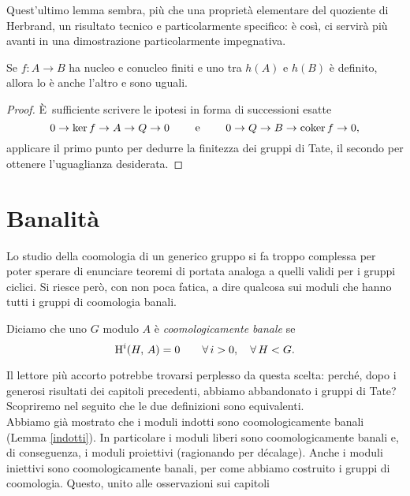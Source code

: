 Quest'ultimo lemma sembra, più che una proprietà elementare del quoziente di Herbrand, un risultato tecnico e particolarmente specifico: è così, ci servirà più avanti in una dimostrazione particolarmente impegnativa.

\begin{lemma}\label{Herb3}
	Se $ f \colon A \to B $ ha nucleo e conucleo finiti e uno tra $ h(A) $ e $h(B) $ è definito, allora lo è anche l'altro e sono uguali.
\end{lemma}

\begin{proof}
	È\ sufficiente scrivere le ipotesi in forma di successioni esatte
	\[ 0 \to \ker f \to A \to Q \to 0 \qquad\text{ e } \qquad 0 \to Q \to B \to \operatorname{coker} f \to 0, \]
	applicare il primo punto per dedurre la finitezza dei gruppi di Tate, il secondo per ottenere l'uguaglianza desiderata.
\end{proof}



\section{Banalità}
Lo studio della coomologia di un generico gruppo si fa troppo complessa per poter sperare di enunciare teoremi di portata analoga a quelli validi per i gruppi ciclici. Si riesce però, con non poca fatica, a dire qualcosa sui moduli che hanno tutti i gruppi di coomologia banali.

\begin{definition}
	Diciamo che uno $ G $ modulo $ A $ è \emph{coomologicamente banale} se
	$$  \operatorname{H}^i(H, \, A) = 0 \qquad \forall \, i > 0, \quad  \forall \, H < G.  $$
\end{definition}

Il lettore più accorto potrebbe trovarsi perplesso da questa scelta: perché, dopo i generosi risultati dei capitoli precedenti, abbiamo abbandonato i gruppi di Tate? Scopriremo nel seguito che le due definizioni sono equivalenti. \\

Abbiamo già mostrato che i moduli indotti sono coomologicamente banali (Lemma \ref{indotti}). In particolare i moduli liberi sono coomologicamente banali e, di conseguenza, i moduli proiettivi (ragionando per décalage). Anche i moduli iniettivi sono coomologicamente banali, per come abbiamo costruito i gruppi di coomologia. Questo, unito alle osservazioni sui capitoli 



